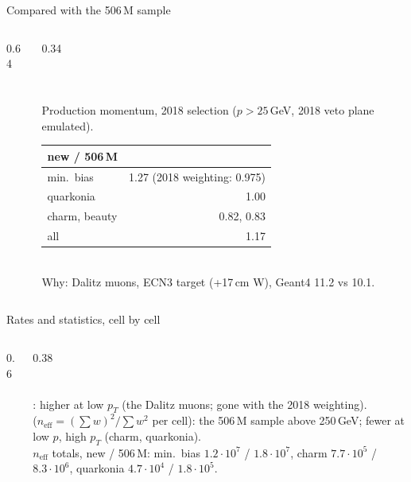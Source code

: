 \documentclass[aspectratio=169,10pt]{beamer}
\begin{document}
\begin{frame}{Compared with the 506\,M sample}
  \begin{columns}[c]
    \begin{column}{0.64\textwidth}
    \end{column}
    \begin{column}{0.34\textwidth}
      \\[0.3mm]
      \\[0.3mm]
      \\[0.3mm]
      \\[0.5mm]
      \scriptsize
      Production momentum, 2018 selection ($p>25$\,GeV, 2018 veto plane emulated).\\[0.5mm]
      \begin{tabular}{@{}lr@{}}
        \toprule
        new / 506\,M & \\
        \midrule
        min.\ bias & 1.27 (2018 weighting: 0.975)\\
        quarkonia & 1.00\\
        charm, beauty & 0.82, 0.83\\
        all & 1.17\\
        \bottomrule
      \end{tabular}\\[1mm]
      Why: Dalitz muons, ECN3 target (+17\,cm W), Geant4 11.2 vs 10.1.
    \end{column}
  \end{columns}
\end{frame}

\begin{frame}{Rates and statistics, cell by cell}
  \begin{columns}[c]
    \begin{column}{0.6\textwidth}
    \end{column}
    \begin{column}{0.38\textwidth}
      \\[0.3mm]
      \\[0.3mm]
      \\[1mm]
      \footnotesize
      \scriptsize
      : higher at low $p_T$ (the Dalitz muons; gone with the 2018 weighting).\\[1mm]
       ($n_\text{eff} = (\sum w)^2/\sum w^2$ per cell):  the 506\,M sample above 250\,GeV; fewer at low $p$, high $p_T$ (charm, quarkonia).\\[1mm]
      $n_\text{eff}$ totals, new / 506\,M: min.\ bias $1.2\cdot10^7$ / $1.8\cdot10^7$, charm $7.7\cdot10^5$ / $8.3\cdot10^6$, quarkonia $4.7\cdot10^4$ / $1.8\cdot10^5$.
    \end{column}
  \end{columns}
\end{frame}
\end{document}
